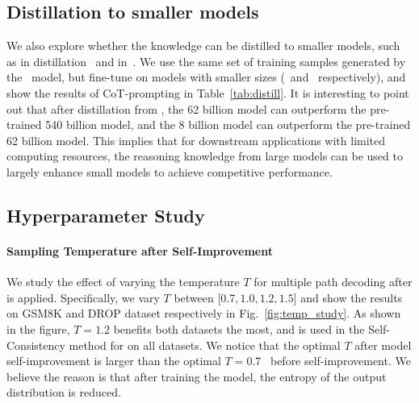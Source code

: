 
\subsection{Distillation to smaller models}
\label{sec:exp_distill}

We also explore whether the knowledge can be distilled to smaller models, such as in distillation~\citep{hinton2015distilling} and in~\citet{star}. We use the same set of training samples generated by the \bigmodel~model, but fine-tune on models with smaller sizes (\smallmodel~and \midmodel~respectively), and show the results of CoT-prompting in Table~\ref{tab:distill}. It is interesting to point out that after distillation from \method, the 62 billion model can outperform the pre-trained 540 billion model, and the 8 billion model can outperform the pre-trained 62 billion model. This implies that for downstream applications with limited computing resources, the reasoning knowledge from large models can be used to largely enhance small models to achieve competitive performance.


\subsection{Hyperparameter Study}

\paragraph{Sampling Temperature after Self-Improvement}
We study the effect of varying the temperature $T$ for multiple path decoding after \method is applied. Specifically, we vary $T$ between [$0.7, 1.0, 1.2, 1.5$] and show the results on GSM8K and DROP dataset respectively in Fig.~\ref{fig:temp_study}. As shown in the figure, $T=1.2$ benefits both datasets the most, and is used in the Self-Consistency method for \method on all datasets. We notice that the optimal $T$ after model self-improvement is larger than the optimal $T=0.7$~\citep{Wang2022SelfConsistencyIC} before self-improvement. We believe the reason is that after training the model, the entropy of the output distribution is reduced.

